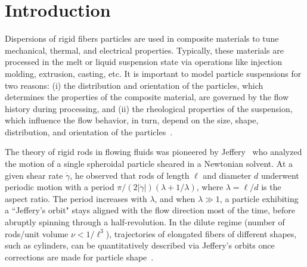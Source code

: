 \documentclass[AMA,STIX1COL]{WileyNJD-v2}
\begin{document}
\maketitle


\section{Introduction}\label{s:intro}
Dispersions of rigid fibers particles are used in composite materials to
tune mechanical, thermal, and electrical properties. Typically, these
materials are processed in the melt or liquid suspension state via
operations like injection molding, extrusion, casting, etc. It is
important to model particle suspensions for two reasons: (i) the
distribution and orientation of the particles, which determines the
properties of the composite material, are governed by the flow history
during processing, and (ii) the rheological properties of the
suspension, which influence the flow behavior, in turn, depend on the
size, shape, distribution, and orientation of the
particles~\cite{larsoncf}.

The theory of rigid rods in flowing fluids was pioneered by
Jeffery~\cite{Jeffery1922} who analyzed the motion of a single
spheroidal particle sheared in a Newtonian solvent. At a given shear
rate $\dot{\gamma}$, he observed that rods of length $\ell$ and diameter
$d$ underwent periodic motion with a period $\pi/(2|\dot{\gamma}|)
(\lambda + 1/\lambda)$, where $\lambda = \ell/d$ is the aspect ratio.
The period increases with $\lambda$, and when $\lambda \gg 1$, a
particle exhibiting a ``Jeffery's orbit" stays aligned with the flow
direction most of the time, before abruptly spinning through a
half-revolution. In the dilute regime (number of rods/unit volume $\nu <
1/\ell^3$), trajectories of elongated fibers of different shapes, such
as cylinders, can be quantitatively described via Jeffery's orbits once
corrections are made for particle shape~\cite{Bretherton1962}.
\end{document}
